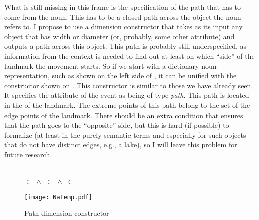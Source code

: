 What is still missing in this frame is the specification of the path that has to come from the noun. This has to be a closed path across the object the noun refers to. I propose to use a dimension constructor that takes as its input any object that has width or diameter (or, probably, some other attribute) and outputs a path across this object. This path is probably still underspecified, as information from the context is needed to find out at least on which ``side'' of the landmark the movement starts. So if we start with a dictionary noun representation, such as shown on the left side of , it can be unified with the constructor shown on . This constructor is similar to those we have already seen. It specifies the \NOUNDIM attribute of the event as being of type \textit{path}. This path is located in the \LOC of the landmark. The extreme points of this path belong to the set of the edge points of the landmark. There should be an extra condition that ensures that the path goes to the ``opposite'' side, but this is hard (if possible) to formalize (at least in the purely semantic terms and especially for such objects that do not have distinct edges, e.g., a lake), so I will leave this problem for future research.  

\begin{figure}\small
\begin{minipage}{0.3\textwidth}
\end{minipage}\hfill%
\begin{minipage}{0.3\textwidth}\centering
{}\\
 $\in$  $\,\wedge\,$  $\in$  $\,\wedge\,$  $\in$ 
\end{minipage}\hfill%
\begin{minipage}{0.25\textwidth}
\texttt{[image: NaTemp.pdf]}
\end{minipage}
\caption{Path dimension constructor\label{constructor:path}}
\end{figure}

